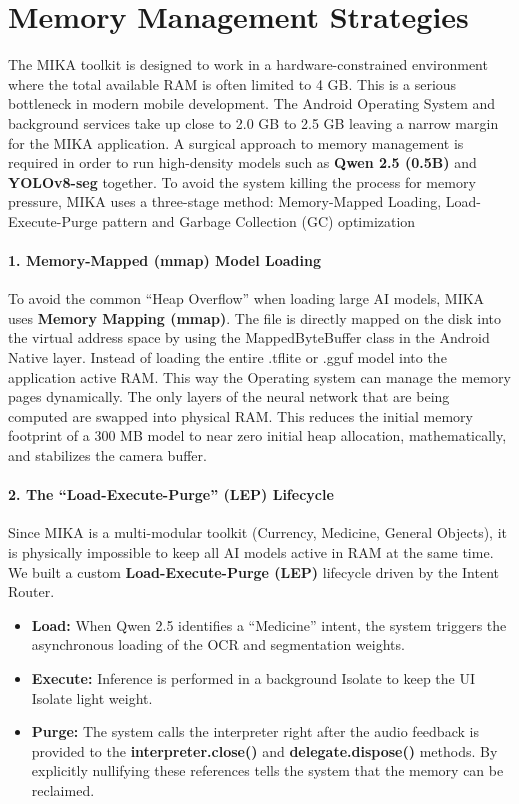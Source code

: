 \documentclass[12pt,a4paper]{report}
\begin{document}
\section{Memory Management Strategies}
 
The MIKA toolkit is designed to work in a hardware-constrained environment where the total available RAM is often limited to 4 GB. This is a serious bottleneck in modern mobile development. The Android Operating System and background services take up close to 2.0 GB to 2.5 GB leaving a narrow margin for the MIKA application. A surgical approach to memory management is required in order to run high-density models such as \textbf{Qwen 2.5 (0.5B)} and \textbf{YOLOv8-seg} together. To avoid the system killing the process for memory pressure, MIKA uses a three-stage method: Memory-Mapped Loading, Load-Execute-Purge pattern and Garbage Collection (GC) optimization
 
\paragraph{1. Memory-Mapped (mmap) Model Loading} To avoid the common “Heap Overflow” when loading large AI models, MIKA uses \textbf{Memory Mapping (mmap)}. The file is directly mapped on the disk into the virtual address space by using the MappedByteBuffer class in the Android Native layer.  
\noindent Instead of loading the entire .tflite or .gguf model into the application active RAM. This way the Operating system can manage the memory pages dynamically. The only layers of the neural network that are being computed are swapped into physical RAM. This reduces the initial memory footprint of a 300 MB model to near zero initial heap allocation, mathematically, and stabilizes the camera buffer.
 
\paragraph{2. The ``Load-Execute-Purge'' (LEP) Lifecycle} Since MIKA is a multi-modular toolkit (Currency, Medicine, General Objects), it is physically impossible to keep all AI models active in RAM at the same time. We built a custom \textbf{Load-Execute-Purge (LEP)} lifecycle driven by the Intent Router. 
\begin{itemize}
    \item \textbf{Load:} When Qwen 2.5 identifies a “Medicine” intent, the system triggers the asynchronous loading of the OCR and segmentation weights.
    \item \textbf{Execute:} Inference is performed in a background Isolate to keep the UI Isolate light weight.
    \item \textbf{Purge:}  The system calls the interpreter right after the audio feedback is provided to the \textbf{interpreter.close()} and \textbf{delegate.dispose()} methods. By explicitly nullifying these references tells the system that the memory can be reclaimed.
\end{itemize}
 
\end{document}
